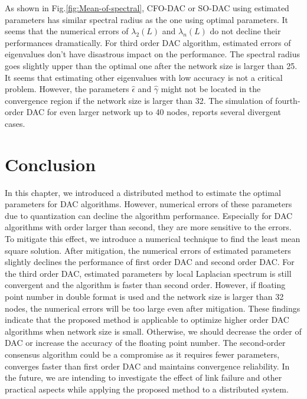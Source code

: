 As shown in Fig.\ref{fig:Mean-of-spectral}, CFO-DAC or SO-DAC using
estimated parameters has similar spectral radius as the one using
optimal parameters. It seems that the numerical errors of $\lambda_{2}\left(L\right)$
and $\lambda_{n}\left(L\right)$ do not decline their performances
dramatically. For third order DAC algorithm, estimated errors of eigenvalues
don't have disastrous impact on the performance. The spectral radius
goes slightly upper than the optimal one after the network size is
larger than 25. It seems that estimating other eigenvalues with low
accuracy is not a critical problem. However, the parameters $\hat{\epsilon}$
and $\hat{\gamma}$ might not be located in the convergence region
if the network size is larger than 32. The simulation of fourth-order
DAC for even larger network up to 40 nodes, reports several divergent
cases.


\section{\label{sub:Conclusion}Conclusion}

In this chapter, we introduced a distributed method to estimate the
optimal parameters for DAC algorithms. However, numerical errors of
these parameters due to quantization  can decline the algorithm performance.
Especially for DAC algorithms with order larger than second, they
are more sensitive to the errors. To mitigate this effect, we introduce
a numerical technique to find the least mean square solution. After
mitigation, the numerical errors of estimated parameters slightly
declines the performance of first order DAC and second order DAC.
For the third order DAC, estimated parameters by local Laplacian spectrum
is still convergent and the algorithm is faster than second order.
 However, if floating point number in double format is used and the
network size is larger than 32 nodes, the numerical errors will be
too large even after mitigation. These findings indicate that the
proposed method is applicable to optimize higher order DAC algorithms
when network size is small.  Otherwise, we should decrease the order
of DAC or increase the accuracy of the floating point number. The
second-order consensus algorithm could be a compromise as it requires
fewer parameters, converges faster than first order DAC and maintains
convergence reliability. In the future, we are intending to investigate
the effect of link failure and other practical aspects while applying
the proposed method to a distributed system. 


